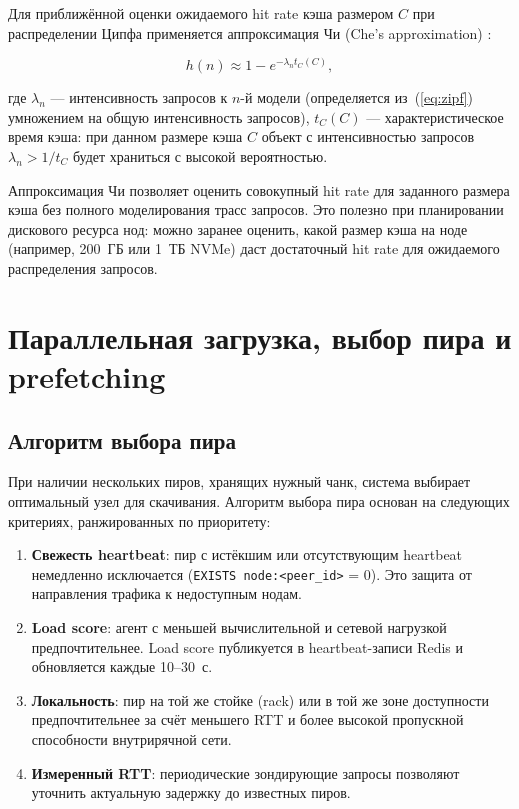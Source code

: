 Для приближённой оценки ожидаемого hit rate кэша размером $C$ при распределении Ципфа применяется аппроксимация Чи (Che's approximation) \cite{che_approx}:

\begin{equation}
h(n) \approx 1 - e^{-\lambda_n t_C(C)},
\label{eq:che}
\end{equation}

где $\lambda_n$ --- интенсивность запросов к $n$-й модели (определяется из~(\ref{eq:zipf}) умножением на общую интенсивность запросов), $t_C(C)$ --- характеристическое время кэша: при данном размере кэша $C$ объект с интенсивностью запросов $\lambda_n > 1/t_C$ будет храниться с высокой вероятностью.

Аппроксимация Чи позволяет оценить совокупный hit rate для заданного размера кэша без полного моделирования трасс запросов. Это полезно при планировании дискового ресурса нод: можно заранее оценить, какой размер кэша на ноде (например, 200~ГБ или 1~ТБ NVMe) даст достаточный hit rate для ожидаемого распределения запросов.

\section{Параллельная загрузка, выбор пира и prefetching}

\subsection*{Алгоритм выбора пира}

При наличии нескольких пиров, хранящих нужный чанк, система выбирает оптимальный узел для скачивания. Алгоритм выбора пира основан на следующих критериях, ранжированных по приоритету:

\begin{enumerate}[leftmargin=*]
  \item \textbf{Свежесть heartbeat}: пир с истёкшим или отсутствующим heartbeat немедленно исключается (\texttt{EXISTS node:<peer\_id>} = 0). Это защита от направления трафика к недоступным нодам.
  \item \textbf{Load score}: агент с меньшей вычислительной и сетевой нагрузкой предпочтительнее. Load score публикуется в heartbeat-записи Redis и обновляется каждые 10--30~с.
  \item \textbf{Локальность}: пир на той же стойке (rack) или в той же зоне доступности предпочтительнее за счёт меньшего RTT и более высокой пропускной способности внутрирячной сети.
  \item \textbf{Измеренный RTT}: периодические зондирующие запросы позволяют уточнить актуальную задержку до известных пиров.
\end{enumerate}

